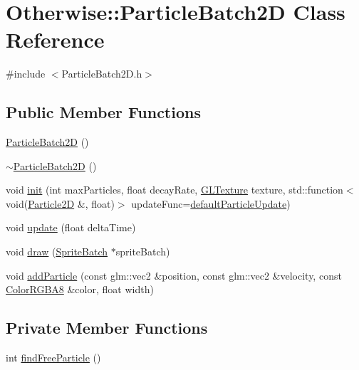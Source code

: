 \hypertarget{class_otherwise_1_1_particle_batch2_d}{}\section{Otherwise\+:\+:Particle\+Batch2D Class Reference}
\label{class_otherwise_1_1_particle_batch2_d}


{\ttfamily \#include $<$Particle\+Batch2\+D.\+h$>$}

\subsection*{Public Member Functions}
\begin{DoxyCompactItemize}
\item 
\hyperlink{class_otherwise_1_1_particle_batch2_d_ab800f725b2e8630ac122bbf4cf164fe5}{Particle\+Batch2D} ()
\item 
\hyperlink{class_otherwise_1_1_particle_batch2_d_a3c38507884ee27a268d99f422cb6b176}{$\sim$\+Particle\+Batch2D} ()
\item 
void \hyperlink{class_otherwise_1_1_particle_batch2_d_ac39cfd55e9baa73573914784f700e28a}{init} (int max\+Particles, float decay\+Rate, \hyperlink{struct_otherwise_1_1_g_l_texture}{G\+L\+Texture} texture, std\+::function$<$ void(\hyperlink{class_otherwise_1_1_particle2_d}{Particle2D} \&, float)$>$ update\+Func=\hyperlink{namespace_otherwise_ac7cfb6f643b2ea32aa02502159d17fb6}{default\+Particle\+Update})
\item 
void \hyperlink{class_otherwise_1_1_particle_batch2_d_aaf50427527be4f8557b090134478a745}{update} (float delta\+Time)
\item 
void \hyperlink{class_otherwise_1_1_particle_batch2_d_ae54c4dc127013ca17633851419493f41}{draw} (\hyperlink{class_otherwise_1_1_sprite_batch}{Sprite\+Batch} $\ast$sprite\+Batch)
\item 
void \hyperlink{class_otherwise_1_1_particle_batch2_d_a0ba1571c0743e3b8e5b54d8366c069c4}{add\+Particle} (const glm\+::vec2 \&position, const glm\+::vec2 \&velocity, const \hyperlink{struct_otherwise_1_1_color_r_g_b_a8}{Color\+R\+G\+B\+A8} \&color, float width)
\end{DoxyCompactItemize}
\subsection*{Private Member Functions}
\begin{DoxyCompactItemize}
\item 
int \hyperlink{class_otherwise_1_1_particle_batch2_d_a1e0cea65acdd2b2b77597dac53af0c73}{find\+Free\+Particle} ()
\end{DoxyCompactItemize}

